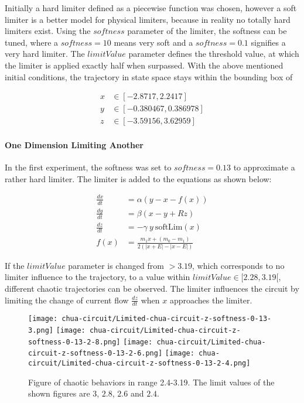 \documentclass[main]{subfiles}
\begin{document}
Initially a hard limiter defined as a piecewise function was chosen, however a soft limiter is a better model for physical limiters, because in reality no totally hard limiters exist. %
%
Using the $softness$ parameter of the limiter, the softness can be tuned, where a \(softness = 10\) means very soft and a \(softness = 0.1\) signifies a very hard limiter. %
%
The $limitValue$ parameter defines the threshold value, at which the limiter is applied exactly half when surpassed. %
%
With the above mentioned initial conditions, the trajectory in state space stays within the bounding box of 

\begin{align*}
x &\in [-2.8717,2.2417]\\
y &\in [-0.380467,0.386978]\\
z &\in [-3.59156,3.62959]
\end{align*}

\paragraph{One Dimension Limiting Another}

In the first experiment, the softness was set to \(softness=0.13\) to approximate a rather hard limiter. The limiter is added to the equations as shown below:

\begin{align*}
\frac{dx}{dt}&=\alpha (y-x-f(x)) \\
\frac{dy}{dt}&=\beta (x-y + Rz)\\
\frac{dz}{dt}&=-\gamma ~ y ~ \text{softLim}(x)\\
f (x) &= \frac{m_1 x + (m_0 - m_1)}{2 (| x + E | -| x - E |)}
\end{align*}

If the $limitValue$ parameter is changed from \(>3.19\), which corresponds to no limiter influence to the trajectory, to a value within \(limitValue \in [2.28,3.19[\), different chaotic trajectories can be observed. %
%
The limiter influences the circuit by limiting the change of current flow \(\frac{dz}{dt}\) when \(x\) approaches the limiter.

\begin{figure}[H]
\centering
\texttt{[image: chua-circuit/Limited-chua-circuit-z-softness-0-13-3.png]}
\texttt{[image: chua-circuit/Limited-chua-circuit-z-softness-0-13-2-8.png]}
\texttt{[image: chua-circuit/Limited-chua-circuit-z-softness-0-13-2-6.png]}
\texttt{[image: chua-circuit/Limited-chua-circuit-z-softness-0-13-2-4.png]}
\caption[Figure of chaotic behaviors in range 2.4-3.19]{Figure of chaotic behaviors in range 2.4-3.19. The limit values of the shown figures are \(3\), \(2.8\), \(2.6\) and \(2.4\).}
\label{figure:z-2.4-3.19-chaotictrajectories}
\end{figure}
\end{document}
